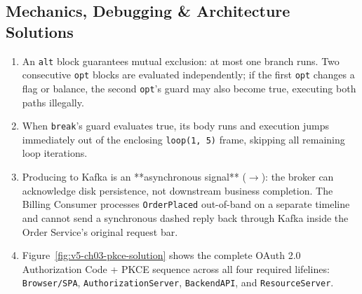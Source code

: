 \subsection*{Mechanics, Debugging \& Architecture Solutions}
\begin{enumerate}[label=\textbf{Solution~\thechapter.\arabic*}, leftmargin=*]
  \item An \texttt{alt} block guarantees mutual exclusion: at most one branch runs. Two consecutive \texttt{opt} blocks are evaluated independently; if the first \texttt{opt} changes a flag or balance, the second \texttt{opt}'s guard may also become true, executing both paths illegally.
  \item When \texttt{break}'s guard evaluates true, its body runs and execution jumps immediately out of the enclosing \texttt{loop(1, 5)} frame, skipping all remaining loop iterations.
  \item Producing to Kafka is an **asynchronous signal** ($\rightarrow$): the broker can acknowledge disk persistence, not downstream business completion. The Billing Consumer processes \texttt{OrderPlaced} out-of-band on a separate timeline and cannot send a synchronous dashed reply back through Kafka inside the Order Service's original request bar.
  \item Figure~\ref{fig:v5-ch03-pkce-solution} shows the complete OAuth 2.0 Authorization Code + PKCE sequence across all four required lifelines: \texttt{Browser/SPA}, \texttt{AuthorizationServer}, \texttt{BackendAPI}, and \texttt{ResourceServer}.
\end{enumerate}

